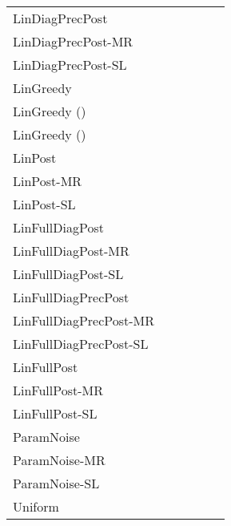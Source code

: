 \documentclass{article} \usepackage{iclr2018_conference,times}
\begin{document}
\begin{landscape}
\begin{table}[ht]
\begin{tabular}{llllll}
LinDiagPrecPost & & & & & \bm{} \\
LinDiagPrecPost-MR & & & & &  \\
LinDiagPrecPost-SL & & & & &  \\
LinGreedy & & & & &  \\
LinGreedy () & & & & &  \\
LinGreedy () & & & & &  \\
LinPost & & & & &  \\
LinPost-MR & & & & &  \\
LinPost-SL & & & & &  \\
LinFullDiagPost & & & & &  \\
LinFullDiagPost-MR & & & & &  \\
LinFullDiagPost-SL & & & & &  \\
LinFullDiagPrecPost & & & & &  \\
LinFullDiagPrecPost-MR & & & & \bm{}&  \\
LinFullDiagPrecPost-SL & & & & &  \\
LinFullPost & & & & &  \\
LinFullPost-MR & & & & &  \\
LinFullPost-SL & & & & &  \\
ParamNoise & & & & &  \\
ParamNoise-MR & & & & &  \\
ParamNoise-SL & & & & &  \\
Uniform & & & & &  \\
\bottomrule
\end{tabular}
 \end{table}
\end{landscape}
\end{document}
